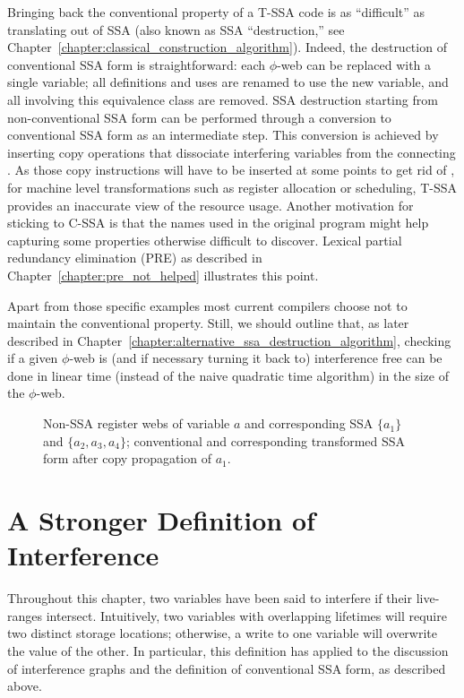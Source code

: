 Bringing back the conventional property of a T-SSA code is as ``difficult'' as translating out of SSA (also known as SSA ``destruction,'' see Chapter~\ref{chapter:classical_construction_algorithm}). 
Indeed, the destruction of conventional SSA form is straightforward: 
each $\phi$-web can be replaced with a single variable; 
all definitions and uses are renamed to use the new variable, and all \phifuns involving this equivalence class are removed. 
SSA destruction starting from non-conventional SSA form can be performed through a conversion to conventional SSA form as an intermediate step. 
This conversion is achieved by inserting copy operations that dissociate interfering variables from the connecting \phifuns. 
As those copy instructions will have to be inserted at some points to get rid of \phifuns, for machine level transformations such as register allocation or scheduling, T-SSA provides an inaccurate view of the resource usage. 
Another motivation for sticking to C-SSA is that the names used in the original program might help capturing some properties otherwise difficult to discover. 
Lexical partial redundancy elimination (PRE) as described in Chapter~\ref{chapter:pre_not_helped} illustrates this point.

Apart from those specific examples most current compilers choose not to maintain the conventional property. 
Still, we should outline that, as later described in Chapter~\ref{chapter:alternative_ssa_destruction_algorithm}, checking if a given $\phi$-web is (and if necessary turning it back to) interference free can be done in linear time (instead of the naive quadratic time algorithm) in the size of the $\phi$-web.

\begin{figure}[h]
\caption{\protect{} Non-SSA register webs of variable $a$ and
\protect{} corresponding SSA \phiwebs $\{a_1\}$ and $\{a_2,a_3,a_4\}$; 
\protect{} conventional and 
\protect{} corresponding transformed SSA form after copy propagation of $a_1$.}
\label{fig:properties_and_flavors:conventional}
\end{figure}



\section{A Stronger Definition of Interference}
\label{sec:properties_and_flavors:ultimate_interference}
Throughout this chapter, two variables have been said to interfere if their live-ranges intersect. 
Intuitively, two variables with overlapping lifetimes will require two distinct storage locations; 
otherwise, a write to one variable will overwrite the value of the other. 
In particular, this definition has applied to the discussion of interference graphs and the definition of conventional SSA form, as described above.

